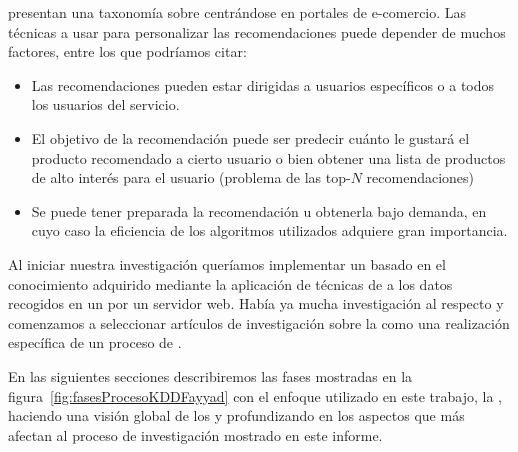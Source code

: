 \citet{SchaferKonstanRiedl-ECommerceRecomendation-2001} presentan una taxonomía sobre \srs centrándose en portales de e-comercio. Las técnicas a usar para personalizar las recomendaciones puede depender de muchos factores, entre los que podríamos citar:
\begin{itemize}
  \item Las recomendaciones pueden estar dirigidas a usuarios específicos o a todos los usuarios del servicio.
  \item El objetivo de la recomendación puede ser predecir cuánto le gustará el producto recomendado a cierto usuario o bien obtener una lista de productos de alto interés para el usuario (problema de las top-$N$ recomendaciones)
  \item Se puede tener preparada la recomendación u obtenerla bajo demanda, en cuyo caso la eficiencia de los algoritmos utilizados adquiere gran importancia.
\end{itemize}

Al iniciar nuestra investigación queríamos implementar un \srw basado en el conocimiento adquirido mediante la aplicación de técnicas de \wum a los datos recogidos en un \flog por un servidor web. Había ya mucha investigación al respecto y comenzamos a seleccionar artículos de investigación sobre la \WUM como una realización específica de un proceso de \KDD.

En las siguientes secciones describiremos las fases mostradas en la figura~\ref{fig:fasesProcesoKDDFayyad} con el enfoque utilizado en este trabajo, la \wum, haciendo una visión global de los \SRW y profundizando en los aspectos que más afectan al proceso de investigación mostrado en este informe.
